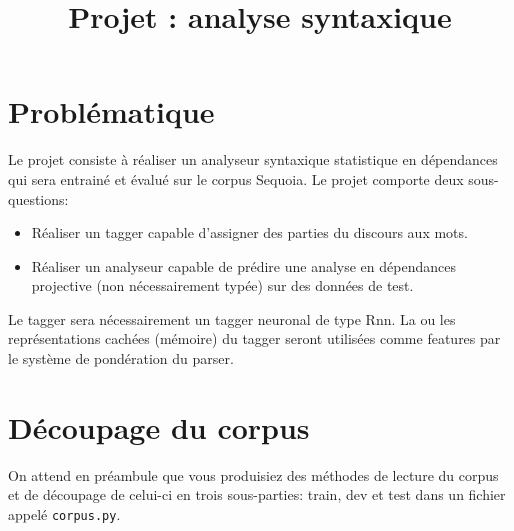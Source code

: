 \documentclass[a4paper,11pt]{article}
\title{Projet : analyse syntaxique}
\author{}
\date{}
\begin{document}
\maketitle

\section{Problématique}

Le projet consiste à réaliser un analyseur syntaxique statistique en dépendances
qui sera entrainé et évalué sur le corpus Sequoia. Le projet comporte deux sous-questions:
\begin{itemize}
\item Réaliser un tagger capable d'assigner des parties du discours aux mots.
\item Réaliser un analyseur capable de prédire une analyse en dépendances projective  (non nécessairement typée) sur des données de test. 
\end{itemize}
Le tagger sera nécessairement un tagger neuronal de type {\sc Rnn}. La ou les représentations cachées (mémoire) du tagger seront utilisées comme features par le système de pondération du parser. 

\section{Découpage du corpus}

On attend en préambule que vous produisiez des méthodes de lecture du corpus et de découpage de celui-ci en trois sous-parties: train, dev et test dans un fichier appelé \verb+corpus.py+.
\end{document}
